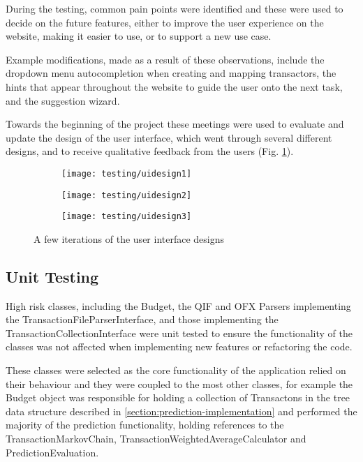 During the testing, common pain points were identified and these were used to decide on the future features, either to improve the user experience on the website, making it easier to use, or to support a new use case.

Example modifications, made as a result of these observations, include the dropdown menu autocompletion when creating and mapping transactors, the hints that appear throughout the website to guide the user onto the next task, and the suggestion wizard.

Towards the beginning of the project these meetings were used to evaluate and update the design of the user interface, which went through several different designs, and to receive qualitative feedback from the users (Fig. \ref{fig:ui-design}).

\begin{figure}
\centering
\begin{subfigure}{0.34\textwidth}
  \centering
  \texttt{[image: testing/uidesign1]}
\end{subfigure}%
\begin{subfigure}{0.34\textwidth}
  \centering
  \texttt{[image: testing/uidesign2]}
\end{subfigure}
\begin{subfigure}{0.31\textwidth}
  \centering
  \texttt{[image: testing/uidesign3]}
\end{subfigure}
\caption{A few iterations of the user interface designs}
\label{fig:ui-design}
\end{figure}

\subsection{Unit Testing}
High risk classes, including the Budget, the QIF and OFX Parsers implementing the TransactionFileParserInterface, and those implementing the TransactionCollectionInterface were unit tested to ensure the functionality of the classes was not affected when implementing new features or refactoring the code.

These classes were selected as the core functionality of the application relied on their behaviour and they were coupled to the most other classes, for example the Budget object was responsible for holding a collection of Transactons in the tree data structure described in \autoref{section:prediction-implementation} and performed the majority of the prediction functionality, holding references to the TransactionMarkovChain, TransactionWeightedAverageCalculator and PredictionEvaluation.


